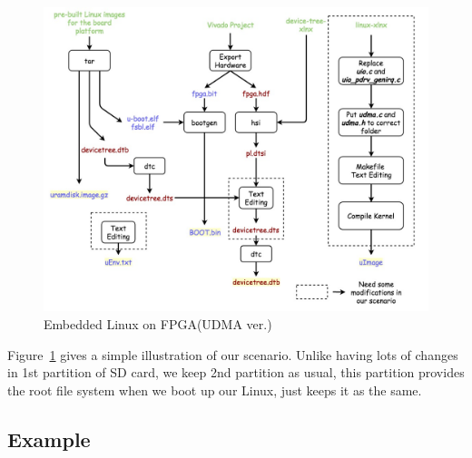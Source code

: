 \begin{figure}[!htb]
  \centering
  \includegraphics[scale=0.4]{images/new_embedded_linux.jpg}
  \caption[Embedded Linux on FPGA(UDMA ver.)]{Embedded Linux on FPGA(UDMA ver.)}
  \label{fig:Embedded Linux on FPGA(UDMA ver.)}
\end{figure}

Figure~\ref{fig:Embedded Linux on FPGA(UDMA ver.)} gives a simple illustration of our scenario. Unlike having lots of changes in 1st partition of SD card, we keep 2nd partition as usual, this partition provides the root file system when we boot up our Linux, just keeps it as the same.

\subsection{Example}
\label{subsec:Example}

